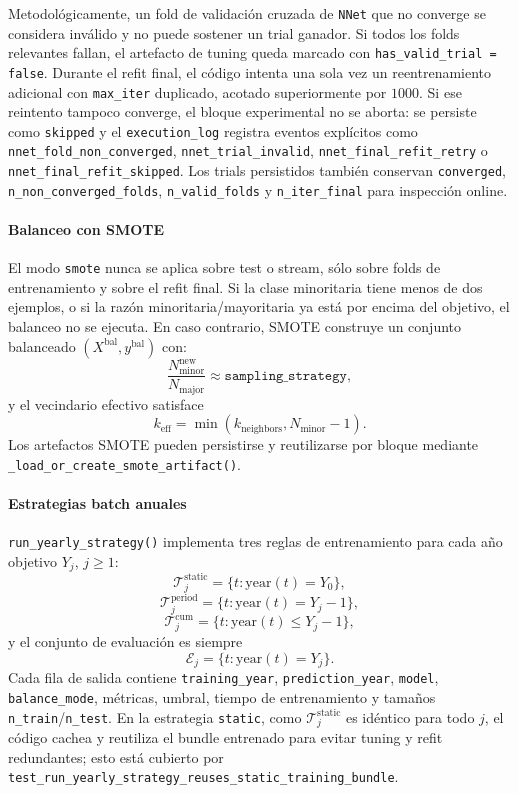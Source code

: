 Metodol\'ogicamente, un fold de validaci\'on cruzada de \texttt{NNet} que no converge se considera inv\'alido y no puede sostener un trial ganador. Si todos los folds relevantes fallan, el artefacto de tuning queda marcado con \texttt{has\_valid\_trial = false}. Durante el refit final, el c\'odigo intenta una sola vez un reentrenamiento adicional con \texttt{max\_iter} duplicado, acotado superiormente por \(1000\). Si ese reintento tampoco converge, el bloque experimental no se aborta: se persiste como \texttt{skipped} y el \texttt{execution\_log} registra eventos expl\'icitos como \texttt{nnet\_fold\_non\_converged}, \texttt{nnet\_trial\_invalid}, \texttt{nnet\_final\_refit\_retry} o \texttt{nnet\_final\_refit\_skipped}. Los trials persistidos tambi\'en conservan \texttt{converged}, \texttt{n\_non\_converged\_folds}, \texttt{n\_valid\_folds} y \texttt{n\_iter\_final} para inspecci\'on online.

\paragraph{Balanceo con SMOTE}
El modo \texttt{smote} nunca se aplica sobre test o stream, s\'olo sobre folds de entrenamiento y sobre el refit final. Si la clase minoritaria tiene menos de dos ejemplos, o si la raz\'on minoritaria/mayoritaria ya est\'a por encima del objetivo, el balanceo no se ejecuta. En caso contrario, SMOTE construye un conjunto balanceado \((X^{\mathrm{bal}}, y^{\mathrm{bal}})\) con:
\[
\frac{N_{\mathrm{minor}}^{\mathrm{new}}}{N_{\mathrm{major}}}
 \approx
\texttt{sampling\_strategy},
\]
y el vecindario efectivo satisface
\[
k_{\mathrm{eff}} = \min(k_{\mathrm{neighbors}}, N_{\mathrm{minor}} - 1).
\]
Los artefactos SMOTE pueden persistirse y reutilizarse por bloque mediante \texttt{\_load\_or\_create\_smote\_artifact()}.

\paragraph{Estrategias batch anuales}
\texttt{run\_yearly\_strategy()} implementa tres reglas de entrenamiento para cada a\~no objetivo \(Y_j\), \(j \ge 1\):
\[
\mathcal{T}^{\mathrm{static}}_j = \{t : \mathrm{year}(t)=Y_0\},
\]
\[
\mathcal{T}^{\mathrm{period}}_j = \{t : \mathrm{year}(t)=Y_j - 1\},
\]
\[
\mathcal{T}^{\mathrm{cum}}_j = \{t : \mathrm{year}(t)\le Y_j - 1\},
\]
y el conjunto de evaluaci\'on es siempre
\[
\mathcal{E}_j = \{t : \mathrm{year}(t)=Y_j\}.
\]
Cada fila de salida contiene \texttt{training\_year}, \texttt{prediction\_year}, \texttt{model}, \texttt{balance\_mode}, m\'etricas, umbral, tiempo de entrenamiento y tama\~nos \texttt{n\_train}/\texttt{n\_test}. En la estrategia \texttt{static}, como \(\mathcal{T}^{\mathrm{static}}_j\) es id\'entico para todo \(j\), el c\'odigo cachea y reutiliza el bundle entrenado para evitar tuning y refit redundantes; esto est\'a cubierto por \texttt{test\_run\_yearly\_strategy\_reuses\_static\_training\_bundle}.

